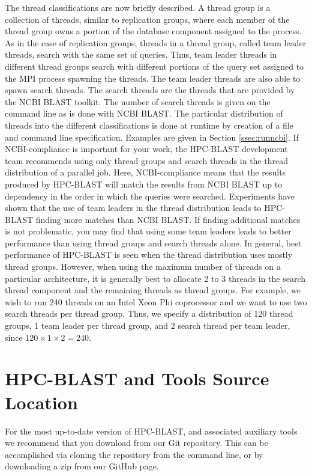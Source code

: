 \documentclass[10pt]{article}
\begin{document}
The thread classifications are now briefly described.  A thread group is a collection of threads, similar to replication groups, where each member of the thread group owns a portion of the database component assigned to the process.
As in the case of replication groups, threads in a thread group, called team leader threads, search with the same set of queries.  Thus, team leader threads in different thread groups search with different portions of the query set assigned to the MPI process spawning the threads.
The team leader threads are also able to spawn search threads.  The search threads are the threads that are provided by the NCBI BLAST toolkit.  The number of search threads is given on the command line as is done with NCBI BLAST.  The particular distribution of threads into the
different classifications is done at runtime by creation of a file and command line specification.  Examples are given in Section \ref{ssec:runncbi}.  If NCBI-compliance is important for your work, the HPC-BLAST development team recommends using only thread groups and search threads
in the thread distribution of a parallel job.  Here, NCBI-compliance means that the results produced by HPC-BLAST will match the results from NCBI BLAST up to dependency in the order in which the queries were searched.  Experiments have shown that the use of team leaders in the
thread distribution leads to HPC-BLAST finding more matches than NCBI BLAST.  If finding additional matches is not problematic, you may find that using some team leaders leads to better performance than using thread groups and search threads alone.
In general, best performance of HPC-BLAST is seen when the thread distribution uses mostly thread groups.  However, when using the maximum number
of threads on a particular architecture, it is generally best to allocate 2 to 3 threads in the search thread component and the remaining threads as thread groups.  For example, we wish to run 240 threads on an Intel Xeon Phi coprocessor and we want to use two search threads per thread
group.  Thus, we specify a distribution of 120 thread groups, 1 team leader per thread group, and 2 search thread per team leader, since \(120 \times 1 \times 2 = 240\).

\clearpage

\section{HPC-BLAST and Tools Source Location} \label{sec:src}

For the most up-to-date version of HPC-BLAST, 
and associated auxiliary tools we recommend that you
download from our Git repository. This can be accomplished via
cloning the repository from the command line, or by downloading a zip
from our GitHub page.   
\end{document}
